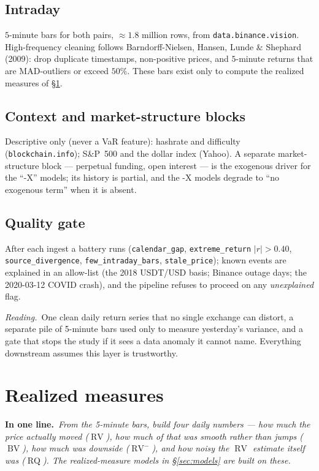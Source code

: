 \documentclass[11pt,a4paper]{article}
\newcommand{\RV}{\operatorname{RV}}
\newcommand{\BV}{\operatorname{BV}}
\newcommand{\RQ}{\operatorname{RQ}}
\newcommand{\intuition}[1]{\par\smallskip\noindent\textit{Reading.}\ #1\par\smallskip}
\newcommand{\inbrief}[1]{\par\noindent\textbf{In one line.}\ \textit{#1}\par\smallskip}
\begin{document}
\subsection{Intraday}

$5$-minute bars for both pairs, $\approx 1.8$ million rows, from
\texttt{data.binance.vision}. High-frequency cleaning follows
Barndorff-Nielsen, Hansen, Lunde \& Shephard (2009): drop duplicate timestamps,
non-positive prices, and $5$-minute returns that are MAD-outliers or exceed
$50\%$. These bars exist only to compute the realized measures of
\S\ref{sec:realized}.

\subsection{Context and market-structure blocks}

Descriptive only (never a VaR feature): hashrate and difficulty
(\texttt{blockchain.info}); S\&P~500 and the dollar index (Yahoo). A separate
market-structure block --- perpetual funding, open interest --- is the
exogenous driver for the ``-X'' models; its history is partial, and the -X
models degrade to ``no exogenous term'' when it is absent.

\subsection{Quality gate}

After each ingest a battery runs (\texttt{calendar\_gap},
\texttt{extreme\_return} $|r|>0.40$, \texttt{source\_divergence},
\texttt{few\_intraday\_bars}, \texttt{stale\_price}); known events are explained
in an allow-list (the 2018 USDT/USD basis; Binance outage days; the
2020-03-12 COVID crash), and the pipeline refuses to proceed on any
\emph{unexplained} flag.

\intuition{One clean daily return series that no single exchange can distort, a
separate pile of 5-minute bars used only to measure yesterday's variance, and a
gate that stops the study if it sees a data anomaly it cannot name. Everything
downstream assumes this layer is trustworthy.}

\section{Realized measures}\label{sec:realized}

\inbrief{From the 5-minute bars, build four daily numbers --- how much the price
actually moved ($\RV$), how much of that was smooth rather than jumps ($\BV$),
how much was downside ($\RV^{-}$), and how noisy the $\RV$ estimate itself was
($\RQ$). The realized-measure models in \S\ref{sec:models} are built on these.}
\end{document}
